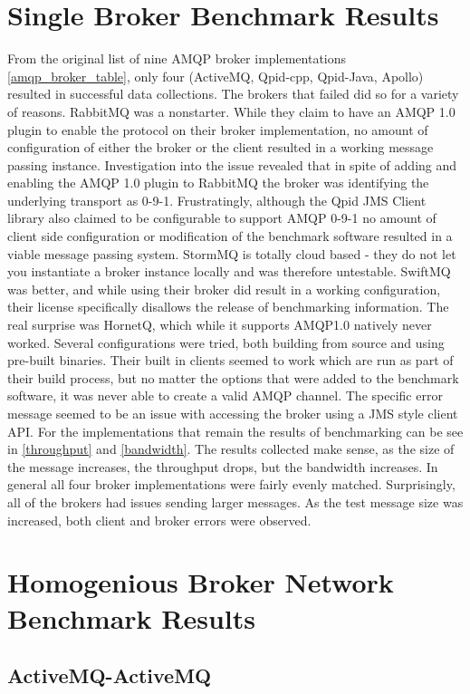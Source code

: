 \documentclass{thesis}
\begin{document}
\section{Single Broker Benchmark Results}
From the original list of nine AMQP broker implementations \ref{amqp_broker_table}, only four (ActiveMQ, Qpid-cpp, Qpid-Java, Apollo) resulted in successful data collections.  The brokers that failed did so for a variety of reasons.  RabbitMQ was a nonstarter.  While they claim to have an AMQP 1.0 plugin to enable the protocol on their broker implementation, no amount of configuration of either the broker or the client resulted in a working message passing instance.  Investigation into the issue revealed that in spite of adding and enabling the AMQP 1.0 plugin to RabbitMQ the broker was identifying the underlying transport as 0-9-1.  Frustratingly, although the Qpid JMS Client library also claimed to be configurable to support AMQP 0-9-1 no amount of client side configuration or modification of the benchmark software resulted in a viable message passing system.  StormMQ is totally cloud based - they do not let you instantiate a broker instance locally and was therefore untestable.  SwiftMQ was better, and while using their broker did result in a working configuration, their license specifically disallows the release of benchmarking information.  The real surprise was HornetQ, which while it supports AMQP1.0 natively never worked.  Several configurations were tried, both building from source and using pre-built binaries.  Their built in clients seemed to work which are run as part of their build process, but no matter the options that were added to the benchmark software, it was never able to create a valid AMQP channel.  The specific error message seemed to be an issue with accessing the broker using a JMS style client API.  For the implementations that remain the results of benchmarking can be see in \ref{throughput} and \ref{bandwidth}.  The results collected make sense, as the size of the message increases, the throughput drops, but the bandwidth increases.  In general all four broker implementations were fairly evenly matched.  Surprisingly, all of the brokers had issues sending larger messages.  As the test message size was increased, both client and broker errors were observed.  

\section{Homogenious Broker Network Benchmark Results}
\subsection{ActiveMQ-ActiveMQ}
\end{document}
